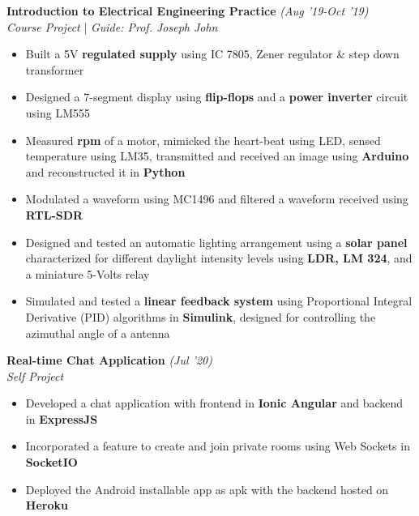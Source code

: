 \documentclass{article}
\begin{document}
\raggedright

\vspace{-5pt}





\large\textbf{Introduction to Electrical Engineering Practice} \hfill{ \textit{(Aug '19-Oct '19)}}
\large \\  \textit{Course Project} | \textit{Guide: Prof. Joseph John}

\vspace{-6pt}

\begin{itemize}[itemsep=-1mm, leftmargin=18pt]
	\item Built a 5V \textbf{regulated supply} using IC 7805, Zener regulator \& step down transformer
	\item Designed a 7-segment display using \textbf{flip-flops} and a \textbf{power inverter} circuit using LM555
	\item Measured \textbf{rpm} of a motor, mimicked the heart-beat using LED, sensed temperature using LM35, transmitted and received an image using \textbf{Arduino} and reconstructed it in \textbf{Python}
	\item Modulated a waveform using MC1496 and filtered a waveform received using \textbf{RTL-SDR}
	\item Designed and tested an automatic lighting arrangement using a \textbf{solar panel} characterized for different daylight intensity levels using \textbf{LDR, LM 324}, and a miniature 5-Volts relay
	\item Simulated and tested a \textbf{linear feedback system} using Proportional Integral Derivative (PID) algorithms in \textbf{Simulink}, designed for controlling the azimuthal angle of a antenna
\end{itemize}

\newpage

\raggedright




\large\textbf{Real-time Chat Application} \hfill{ \textit{(Jul '20)}}
\large \\  \textit{Self Project}

\vspace{-6pt}

\begin{itemize}[itemsep=-1mm, leftmargin=18pt]
	\item Developed a chat application with frontend in \textbf{Ionic Angular} and backend in \textbf{ExpressJS}
	\item Incorporated a feature to create and join private rooms using Web Sockets in \textbf{SocketIO}  
	\item Deployed the Android installable app as apk with the backend hosted on \textbf{Heroku}
\end{itemize}
\end{document}
